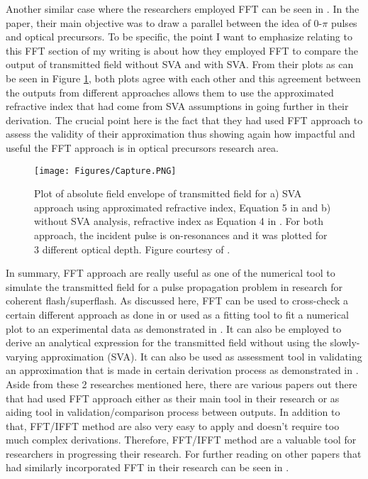 Another similar case where the researchers employed FFT can be seen in \cite{Jeong2008}. In the paper, their main objective was to draw a parallel between the idea of 0-$\pi$ pulses and optical precursors. To be specific, the point I want to emphasize relating to this FFT section of my writing is about how they employed FFT to compare the output of transmitted field without SVA and with SVA. From their plots as can be seen in Figure \ref{fig: svafft}, both plots agree with each other and this agreement between the outputs from different approaches allows them to use the approximated refractive index that had come from SVA assumptions in going further in their derivation. The crucial point here is the fact that they had used FFT approach to assess the validity of their approximation thus showing again how impactful and useful the FFT approach is in optical precursors research area.

\begin{figure}
    \centering
    \texttt{[image: Figures/Capture.PNG]}
    \caption{Plot of absolute field envelope of transmitted field for a) SVA approach using approximated refractive index, Equation 5 in \protect\cite{Jeong2008} and b) without SVA analysis, refractive index as Equation 4 in \protect\cite{Jeong2008}. For both approach, the incident pulse is on-resonances and it was plotted for 3 different optical depth. Figure courtesy of \protect\cite{Jeong2008}.}
    \label{fig: svafft}
\end{figure}

In summary, FFT approach are really useful as one of the numerical tool to simulate the transmitted field for a pulse propagation problem in research for coherent flash/superflash. As discussed here, FFT can be used to cross-check a certain different approach as done in \cite{jeong2010slow} or used as a fitting tool to fit a numerical plot to an experimental data as demonstrated in \cite{Chen2010}. It can also be employed to derive an analytical expression for the transmitted field without using the slowly-varying approximation (SVA). It can also be used as assessment tool in validating an approximation that is made in certain derivation process as demonstrated in \cite{Jeong2008}. Aside from these 2 researches mentioned here, there are various papers out there that had used FFT approach either as their main tool in their research or as aiding tool in validation/comparison process between outputs. In addition to that, FFT/IFFT method are also very easy to apply and doesn't require too much complex derivations. Therefore, FFT/IFFT method are a valuable tool for researchers in progressing their research. For further reading on other papers that had similarly incorporated FFT in their research can be seen in \cite{Jeong2019, jeong2010slow, Chen2010, Macke2015, Oughstun2010, Wei2009, MacKe2009}.
